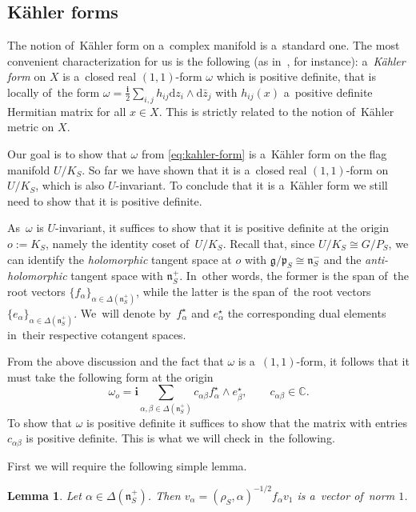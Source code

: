 \documentclass[pdftex]{sigma}
\numberwithin{equation}{section}
\newtheorem{Lemma}[Theorem]{Lemma}
\newcommand{\lieg}{\mathfrak{g}}
\newcommand{\lien}{\mathfrak{n}}
\newcommand{\liep}{\mathfrak{p}}
\newcommand{\bbC}{\mathbb{C}}
\newcommand{\iu}{\boldsymbol{i}}
\newcommand{\kafo}{\omega}
\newcommand{\homroot}{\Delta(\lien_S^+)}
\begin{document}
\subsection{K\"ahler forms}

The notion of~K\"ahler form on a~complex manifold is a~standard one.
The most convenient characterization for us is the following (as in~\cite[Lemma 3.1.7]{huybrechts}, for instance): a~\emph{K\"ahler form} on $X$ is a~closed real $(1, 1)$-form $\omega$ which is positive definite, that is locally of~the form $\omega = \frac{\iu}{2} \sum_{i, j} h_{i j} \mathrm{d} z_i \wedge \mathrm{d} \bar{z}_j$ with $h_{i j}(x)$ a~positive definite Hermitian matrix for all $x \in X$. This is strictly related to the notion of~K\"ahler metric on $X$.

Our goal is to show that $\kafo$ from \eqref{eq:kahler-form} is a~K\"ahler form on the flag manifold $U / K_S$.
So far we have shown that it is a~closed real $(1, 1)$-form on $U / K_S$, which is also $U$-invariant.
To conclude that it is a~K\"ahler form we still need to show that it is positive definite.

As~$\kafo$ is $U$-invariant, it suffices to show that it is positive definite at the origin $o := K_S$, namely the identity coset of~$U / K_S$.
Recall that, since $U / K_S \cong G / P_S$, we can identify the \emph{holomorphic} tangent space at $o$ with $\lieg / \liep_S \cong \lien_S^-$ and the \emph{anti-holomorphic} tangent space with $\lien_S^+$.
In~other words, the former is the span of~the root vectors $\{f_\alpha\}_{\alpha \in \homroot}$, while the latter is the span of~the root vectors $\{e_\alpha\}_{\alpha \in \homroot}$.
We~will denote by~$f_\alpha^\star$ and $e_\alpha^\star$ the corresponding dual elements in~their respective cotangent spaces.

From the above discussion and the fact that $\kafo$ is a~$(1, 1)$-form, it follows that it must take the following form at the origin
\[
\kafo_o = \iu \sum_{\alpha, \beta \in \homroot} c_{\alpha \beta} f_\alpha^\star \wedge e_\beta^\star, \qquad c_{\alpha \beta} \in \bbC.
\]
To show that $\kafo$ is positive definite it suffices to show that the matrix with entries $c_{\alpha \beta}$ is positive definite.
This is what we will check in~the following.

First we will require the following simple lemma.

\begin{Lemma}
Let $\alpha \in \homroot$. Then $v_\alpha = (\rho_S, \alpha)^{-1/2} f_\alpha v_1$ is a~vector of~norm $1$.
\end{Lemma}
\end{document}
